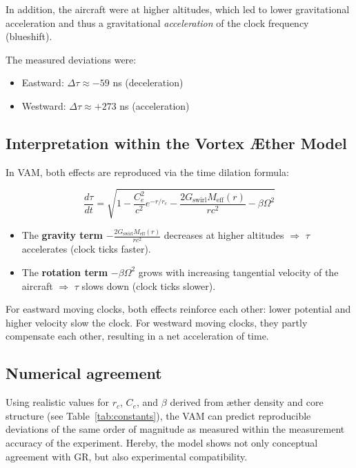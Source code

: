 \documentclass[preprint]{revtex4-2}
\begin{document}
In addition, the aircraft were at higher altitudes, which led to lower gravitational acceleration and thus a gravitational \emph{acceleration} of the clock frequency (blueshift).

The measured deviations were:

\begin{itemize}
    \item Eastward: $\Delta\tau \approx -59$ ns (deceleration)
    \item Westward: $\Delta\tau \approx +273$ ns (acceleration)
\end{itemize}

\subsection{Interpretation within the Vortex Æther Model}

In VAM, both effects are reproduced via the time dilation formula:

\begin{equation}
    \frac{d\tau}{dt} = \sqrt{1 - \frac{C_e^2}{c^2} e^{-r/r_c} - \frac{2G_\text{swirl} M_\text{eff}(r)}{rc^2} - \beta \Omega^2}
\end{equation}

\begin{itemize}
    \item The \textbf{gravity term} $- \frac{2G_\text{swirl} M_\text{eff}(r)}{rc^2}$ decreases at higher altitudes $\Rightarrow$ $\tau$ accelerates (clock ticks faster).
    \item The \textbf{rotation term} $-\beta \Omega^2$ grows with increasing tangential velocity of the aircraft $\Rightarrow$ $\tau$ slows down (clock ticks slower).
\end{itemize}

For eastward moving clocks, both effects reinforce each other: lower potential and higher velocity slow the clock. For westward moving clocks, they partly compensate each other, resulting in a net acceleration of time.
\subsection{Numerical agreement}

Using realistic values for $r_c$, $C_e$, and $\beta$ derived from æther density and core structure (see Table~\ref{tab:constants}), the VAM can predict reproducible deviations of the same order of magnitude as measured within the measurement accuracy of the experiment. Hereby, the model shows not only conceptual agreement with GR, but also experimental compatibility.
\end{document}
